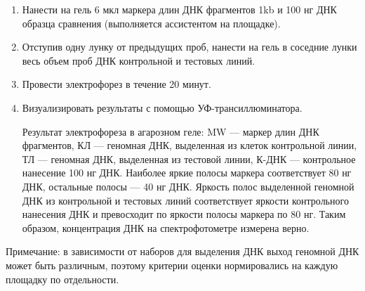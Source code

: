 \begin{enumerate}
\item Нанести на гель 6 мкл маркера длин ДНК фрагментов 1kb и 100 нг ДНК образца сравнения (выполняется ассистентом на площадке).
\item Отступив одну лунку от предыдущих проб, нанести на гель в соседние лунки весь объем проб ДНК контрольной и тестовых линий.
\item Провести электрофорез в течение 20 минут.
\item Визуализировать результаты с помощью УФ-трансиллюминатора.

Результат электрофореза в агарозном геле: MW — маркер длин ДНК фрагментов, КЛ — геномная ДНК, выделенная из клеток контрольной линии, ТЛ — геномная ДНК, выделенная из тестовой линии, К-ДНК — контрольное нанесение 100 нг ДНК. Наиболее яркие полосы маркера соответствует 80 нг ДНК, остальные полосы — 40 нг ДНК. Яркость полос выделенной геномной ДНК из контрольной и тестовых линий соответствует яркости контрольного нанесения ДНК и превосходит по яркости полосы маркера по 80 нг. Таким образом, концентрация ДНК на спектрофотометре измерена верно.

\end{enumerate}

\markSection

Примечание: в зависимости от наборов для выделения ДНК выход геномной ДНК может быть различным, поэтому критерии оценки нормировались на каждую площадку по отдельности.

